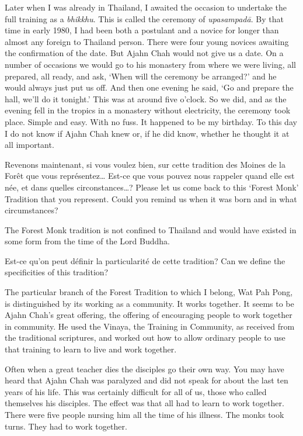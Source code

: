 Later when I was already in Thailand, I awaited the occasion to
undertake the full training as a \emph{bhikkhu}. This is called the
ceremony of \emph{upasampadā}. By that time in early 1980, I had been
both a postulant and a novice for longer than almost any foreign to
Thailand person. There were four young novices awaiting the confirmation
of the date. But Ajahn Chah would not give us a date. On a number of
occasions we would go to his monastery from where we were living, all
prepared, all ready, and ask, `When will the ceremony be arranged?' and
he would always just put us off. And then one evening he said, `Go and
prepare the hall, we'll do it tonight.' This was at around five o'clock. 
So we did, and as the evening fell in the tropics in a monastery without
electricity, the ceremony took place. Simple and easy. With no fuss. It
happened to be my birthday. To this day I do not know if Ajahn Chah knew
or, if he did know, whether he thought it at all important. 

\questionBi%
{Revenons maintenant, si vous voulez bien, sur cette tradition des Moines de la Forêt que vous représentez\ldots{} Est-ce que vous pouvez nous rappeler quand elle est née, et dans quelles circonstances\ldots{}?}%
{Please let us come back to this `Forest Monk' Tradition that you represent. Could you remind us when it was born and in what circumstances?}

\answer{}
The Forest Monk tradition is not confined to Thailand and would have
existed in some form from the time of the Lord Buddha.

\questionBi%
{Est-ce qu'on peut définir la particularité de cette tradition?}%
{Can we define the specificities of this tradition?}

\answer{}
The particular branch of the Forest Tradition to which I belong, Wat
Pah Pong, is distinguished by its working as a community. It works
together. It seems to be Ajahn Chah's great offering, the offering of
encouraging people to work together in community. He used the Vinaya, 
the Training in Community, as received from the traditional scriptures, 
and worked out how to allow ordinary people to use that training to
learn to live and work together. 

Often when a great teacher dies the disciples go their own way. You may
have heard that Ajahn Chah was paralyzed and did not speak for about the
last ten years of his life. This was certainly difficult for all of us, 
those who called themselves his disciples. The effect was that all had
to learn to work together. There were five people nursing him all the
time of his illness. The monks took turns. They had to work together. 

